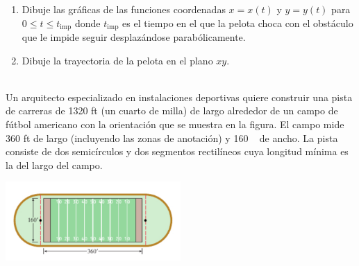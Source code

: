 \documentclass[12pt]{article}
\begin{document}
\begin{enumerate}
    \item Dibuje las gráficas de las funciones coordenadas \( x = x(t) \) y \( y = y(t) \) para \( 0 \leq t \leq t_{\text{imp}} \) donde \( t_{\text{imp}} \) es el tiempo en el que la pelota choca con el obstáculo que le impide seguir desplazándose parabólicamente.
    
    \item Dibuje la trayectoria de la pelota en el plano \( xy \).
\end{enumerate}

     \\
    Un arquitecto especializado en instalaciones deportivas quiere construir una pista de carreras de 1320 ft (un cuarto de milla) de largo alrededor de un campo de fútbol americano con la orientación que se muestra en la figura. El campo mide 360 ft de largo (incluyendo las zonas de anotación) y 160 \  de ancho. La pista consiste de dos semicírculos y dos segmentos rectilíneos cuya longitud mínima es la del largo del campo.

\includegraphics[width=0.5\textwidth, center]{cancha.png}
\end{document}
